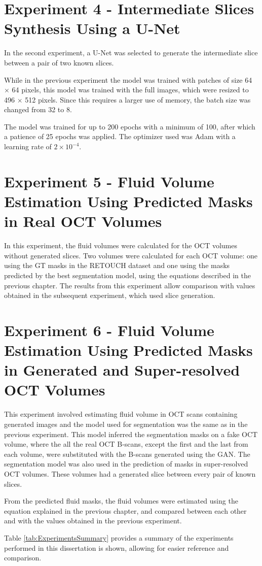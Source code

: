 \section{Experiment 4 - Intermediate Slices Synthesis Using a U-Net}
In the second experiment, a U-Net was selected to generate the intermediate slice between a pair of two known slices. 
\par
While in the previous experiment the model was trained with patches of size 64 $\times$ 64 pixels, this model was trained with the full images, which were resized to 496 $\times$ 512 pixels. Since this requires a larger use of memory, the batch size was changed from 32 to 8.
\par
The model was trained for up to 200 epochs with a minimum of 100, after which a patience of 25 epochs was applied. The optimizer used was Adam with a learning rate of $2 \times 10^{-4}$.

\section{Experiment 5 - Fluid Volume Estimation Using Predicted Masks in Real OCT Volumes}

In this experiment, the fluid volumes were calculated for the OCT volumes without generated slices. Two volumes were calculated for each OCT volume: one using the GT masks in the RETOUCH dataset and one using the masks predicted by the best segmentation model, using the equations described in the previous chapter. The results from this experiment allow comparison with values obtained in the subsequent experiment, which used slice generation.

\section{Experiment 6 - Fluid Volume Estimation Using Predicted Masks in Generated and Super-resolved OCT Volumes}

This experiment involved estimating fluid volume in OCT scans containing generated images and the model used for segmentation was the same as in the previous experiment. This model inferred the segmentation masks on a fake OCT volume, where the all the real OCT B-scans, except the first and the last from each volume, were substituted with the B-scans generated using the GAN. The segmentation model was also used in the prediction of masks in super-resolved OCT volumes. These volumes had a generated slice between every pair of known slices.
\par
From the predicted fluid masks, the fluid volumes were estimated using the equation explained in the previous chapter, and compared between each other and with the values obtained in the previous experiment.
\par
Table \ref{tab:ExperimentsSummary} provides a summary of the experiments performed in this dissertation is shown, allowing for easier reference and comparison.


